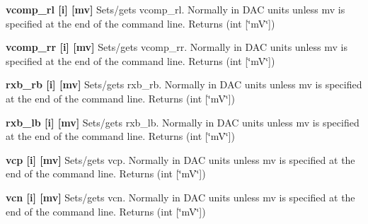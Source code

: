 \begin{DoxyItemize}
\item {\bfseries vcomp\_\-rl \mbox{[}i\mbox{]} \mbox{[}mv\mbox{]}} Sets/gets vcomp\_\-rl. Normally in DAC units unless {\ttfamily mv} is specified at the end of the command line. {\ttfamily Returns} {\ttfamily }(int \mbox{[}\char`\"{}mV\char`\"{}\mbox{]})
\end{DoxyItemize}


\begin{DoxyItemize}
\item {\bfseries vcomp\_\-rr \mbox{[}i\mbox{]} \mbox{[}mv\mbox{]}} Sets/gets vcomp\_\-rr. Normally in DAC units unless {\ttfamily mv} is specified at the end of the command line. {\ttfamily Returns} {\ttfamily }(int \mbox{[}\char`\"{}mV\char`\"{}\mbox{]})
\end{DoxyItemize}


\begin{DoxyItemize}
\item {\bfseries rxb\_\-rb \mbox{[}i\mbox{]} \mbox{[}mv\mbox{]}} Sets/gets rxb\_\-rb. Normally in DAC units unless {\ttfamily mv} is specified at the end of the command line. {\ttfamily Returns} {\ttfamily }(int \mbox{[}\char`\"{}mV\char`\"{}\mbox{]})
\end{DoxyItemize}


\begin{DoxyItemize}
\item {\bfseries rxb\_\-lb \mbox{[}i\mbox{]} \mbox{[}mv\mbox{]}} Sets/gets rxb\_\-lb. Normally in DAC units unless {\ttfamily mv} is specified at the end of the command line. {\ttfamily Returns} {\ttfamily }(int \mbox{[}\char`\"{}mV\char`\"{}\mbox{]})
\end{DoxyItemize}


\begin{DoxyItemize}
\item {\bfseries vcp \mbox{[}i\mbox{]} \mbox{[}mv\mbox{]}} Sets/gets vcp. Normally in DAC units unless {\ttfamily mv} is specified at the end of the command line. {\ttfamily Returns} {\ttfamily }(int \mbox{[}\char`\"{}mV\char`\"{}\mbox{]})
\end{DoxyItemize}


\begin{DoxyItemize}
\item {\bfseries vcn \mbox{[}i\mbox{]} \mbox{[}mv\mbox{]}} Sets/gets vcn. Normally in DAC units unless {\ttfamily mv} is specified at the end of the command line. {\ttfamily Returns} {\ttfamily }(int \mbox{[}\char`\"{}mV\char`\"{}\mbox{]})
\end{DoxyItemize}


